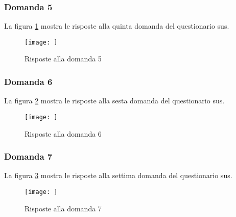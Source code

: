 \subsubsection*{Domanda 5}

\vspace{5pt}
\begin{minipage}{\textwidth}
  \par\noindent La figura \ref{fig:sus_q5} mostra le risposte alla quinta domanda del questionario \gls{sus}.
  \begin{figure}[H]
    \centering
    \texttt{[image: ]}
    \caption{Risposte alla domanda 5}
    \label{fig:sus_q5}
  \end{figure}
\end{minipage}

\subsubsection*{Domanda 6}

\vspace{5pt}
\begin{minipage}{\textwidth}
  \par\noindent La figura \ref{fig:sus_q6} mostra le risposte alla sesta domanda del questionario \gls{sus}.
  \begin{figure}[H]
    \centering
    \texttt{[image: ]}
    \caption{Risposte alla domanda 6}
    \label{fig:sus_q6}
  \end{figure}
\end{minipage}

\subsubsection*{Domanda 7}

\vspace{5pt}
\begin{minipage}{\textwidth}
  \par\noindent La figura \ref{fig:sus_q7} mostra le risposte alla settima domanda del questionario \gls{sus}.
  \begin{figure}[H]
    \centering
    \texttt{[image: ]}
    \caption{Risposte alla domanda 7}
    \label{fig:sus_q7}
  \end{figure}
\end{minipage}

